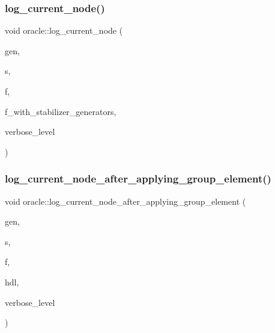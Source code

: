 \subsubsection{\texorpdfstring{log\+\_\+current\+\_\+node()}{log\_current\_node()}}
{\footnotesize\ttfamily void oracle\+::log\+\_\+current\+\_\+node (\begin{DoxyParamCaption}\item[{\mbox{\hyperlink{classgenerator}{generator}} $\ast$}]{gen,  }\item[{\mbox{\hyperlink{galois_8h_a09fddde158a3a20bd2dcadb609de11dc}{I\+NT}}}]{s,  }\item[{ostream \&}]{f,  }\item[{\mbox{\hyperlink{galois_8h_a09fddde158a3a20bd2dcadb609de11dc}{I\+NT}}}]{f\+\_\+with\+\_\+stabilizer\+\_\+generators,  }\item[{\mbox{\hyperlink{galois_8h_a09fddde158a3a20bd2dcadb609de11dc}{I\+NT}}}]{verbose\+\_\+level }\end{DoxyParamCaption})}

\mbox{\label{classoracle_a83654fe90c42572ee993416b5d1c4cb5}} 
\subsubsection{\texorpdfstring{log\+\_\+current\+\_\+node\+\_\+after\+\_\+applying\+\_\+group\+\_\+element()}{log\_current\_node\_after\_applying\_group\_element()}}
{\footnotesize\ttfamily void oracle\+::log\+\_\+current\+\_\+node\+\_\+after\+\_\+applying\+\_\+group\+\_\+element (\begin{DoxyParamCaption}\item[{\mbox{\hyperlink{classgenerator}{generator}} $\ast$}]{gen,  }\item[{\mbox{\hyperlink{galois_8h_a09fddde158a3a20bd2dcadb609de11dc}{I\+NT}}}]{s,  }\item[{ostream \&}]{f,  }\item[{\mbox{\hyperlink{galois_8h_a09fddde158a3a20bd2dcadb609de11dc}{I\+NT}}}]{hdl,  }\item[{\mbox{\hyperlink{galois_8h_a09fddde158a3a20bd2dcadb609de11dc}{I\+NT}}}]{verbose\+\_\+level }\end{DoxyParamCaption})}

